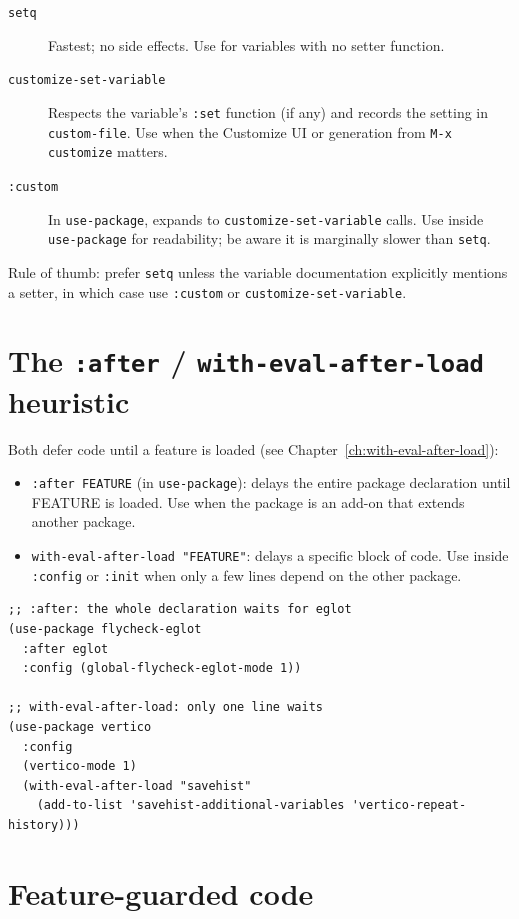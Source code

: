 \begin{description}
  \item[\texttt{setq}] Fastest; no side effects.  Use for variables with no setter function.
  \item[\texttt{customize-set-variable}] Respects the variable's \texttt{:set} function (if any) and records the setting in \texttt{custom-file}.  Use when the Customize UI or generation from \texttt{M-x customize} matters.
  \item[\texttt{:custom}] In \texttt{use-package}, expands to \texttt{customize-set-variable} calls.  Use inside \texttt{use-package} for readability; be aware it is marginally slower than \texttt{setq}.
\end{description}

Rule of thumb: prefer \texttt{setq} unless the variable documentation explicitly mentions a setter, in which case use \texttt{:custom} or \texttt{customize-set-variable}.

\section{The \texttt{:after} / \texttt{with-eval-after-load} heuristic}

Both defer code until a feature is loaded (see Chapter~\ref{ch:with-eval-after-load}):

\begin{itemize}
  \item \texttt{:after FEATURE} (in \texttt{use-package}): delays the entire package declaration until FEATURE is loaded.  Use when the package is an add-on that extends another package.
  \item \texttt{with-eval-after-load "FEATURE"}: delays a specific block of code.  Use inside \texttt{:config} or \texttt{:init} when only a few lines depend on the other package.
\end{itemize}

\begin{verbatim}
;; :after: the whole declaration waits for eglot
(use-package flycheck-eglot
  :after eglot
  :config (global-flycheck-eglot-mode 1))

;; with-eval-after-load: only one line waits
(use-package vertico
  :config
  (vertico-mode 1)
  (with-eval-after-load "savehist"
    (add-to-list 'savehist-additional-variables 'vertico-repeat-history)))
\end{verbatim}

\section{Feature-guarded code}

